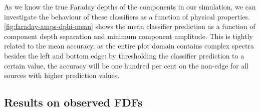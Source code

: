     As we know the true Faraday depths of the components in our simulation, we can investigate the behaviour of these classifiers as a function of physical properties. \autoref{fig:faraday-amps-dphi-mean} shows the mean classifier prediction as a function of component depth separation and minimum component amplitude. This is tightly related to the mean accuracy, as the entire plot domain contains complex spectra besides the left and bottom edge: by thresholding the classifier prediction to a certain value, the accuracy will be one hundred per cent on the non-edge for all sources with higher prediction values.

  \subsection{Results on observed FDFs}
  \label{sec:faraday-results-observed}

